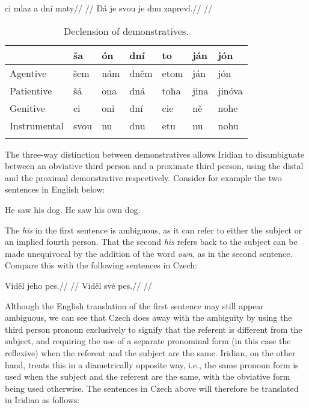\pex
\a{}
\begingl
\gla ci mlaz a dní maty//
\glft {}//
\endgl
\a{}
\begingl
\gla Dá je svou je dnu zapreví.//
\glft {}//
\endgl
\xe

\begin{table}
\footnotesize\sffamily
	\caption{Declension of demonstratives.}
    \medskip
	\begin{tabu}to \textwidth{Y[2]YYYYYY}
		\toprule
						& {ša}	& {ón}	&{dní}& {to}	& {ján}	&{jón}\\
		\midrule \addlinespace
		Agentive&šem&nám&dn\v{e}m&etom&ján&jón\\\addlinespace
		Patientive&šá&ona&dná&toha&jina&jinóva\\\addlinespace
		Genitive&ci&oní&dní&cie&n\v{e}&nohe\\\addlinespace
		Instrumental&svou&nu&dnu&etu&nu&nohu\\\addlinespace
		\bottomrule
		\label{dem-conj}
	\end{tabu}
\end{table}

The three-way distinction between demonstratives allows Iridian to disambiguate between an obviative third person and a proximate third person, using the distal and the proximal demonstrative respectively. Consider for example the two sentences in English below:

\pex
\a He saw his dog.
\a He saw his own dog.\smallskip
\xe

The \emph{his} in the first sentence is ambiguous, as it can refer to either the subject or an implied fourth person. That the second \emph{his} refers back to the subject can be made unequivocal by the addition of the word \emph{own}, as in the second sentence. Compare this with the following sentences in Czech:

\begin{multicols}{2}
  \pex
  \a
  \begingl
  \gla Vid\v{e}l jeho pes.//
  \glft {}//
  \endgl
  \a \begingl
  \gla Vid\v{e}l své pes.//
  \glft {}//
  \endgl
  \xe
\end{multicols}

Although the English translation of the first sentence may still appear ambiguous, we can see that Czech does away with the ambiguity by using the third person pronoun  exclusively to signify that the referent is different from the subject, and requiring the use of a separate pronominal form (in this case the reflexive) when the referent and the subject are the same. Iridian, on the other hand, treats this in a diametrically opposite way, i.e., the same pronoun form is used when the subject and the referent are the same, with the obviative form being used otherwise. The sentences in Czech above will therefore be translated in Iridian as follows:

